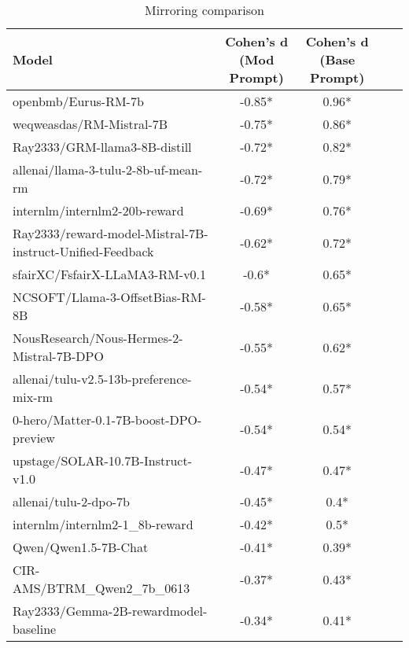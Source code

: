 \begin{table*}[htp]
\centering
\small
\begin{tabular}{lcc|cc}
\toprule
Model & Cohen's d (Mod Prompt) & Cohen's d (Base Prompt) \\
\midrule
openbmb/Eurus-RM-7b & -0.85* & 0.96* \\
weqweasdas/RM-Mistral-7B & -0.75* & 0.86* \\
Ray2333/GRM-llama3-8B-distill & -0.72* & 0.82* \\
allenai/llama-3-tulu-2-8b-uf-mean-rm & -0.72* & 0.79* \\
internlm/internlm2-20b-reward & -0.69* & 0.76* \\
Ray2333/reward-model-Mistral-7B-instruct-Unified-Feedback & -0.62* & 0.72* \\
sfairXC/FsfairX-LLaMA3-RM-v0.1 & -0.6* & 0.65* \\
NCSOFT/Llama-3-OffsetBias-RM-8B & -0.58* & 0.65* \\
NousResearch/Nous-Hermes-2-Mistral-7B-DPO & -0.55* & 0.62* \\
allenai/tulu-v2.5-13b-preference-mix-rm & -0.54* & 0.57* \\
0-hero/Matter-0.1-7B-boost-DPO-preview & -0.54* & 0.54* \\
upstage/SOLAR-10.7B-Instruct-v1.0 & -0.47* & 0.47* \\
allenai/tulu-2-dpo-7b & -0.45* & 0.4* \\
internlm/internlm2-1\_8b-reward & -0.42* & 0.5* \\
Qwen/Qwen1.5-7B-Chat & -0.41* & 0.39* \\
CIR-AMS/BTRM\_Qwen2\_7b\_0613 & -0.37* & 0.43* \\
Ray2333/Gemma-2B-rewardmodel-baseline & -0.34* & 0.41* \\
\bottomrule
\end{tabular}
\normalsize
\caption{Mirroring comparison}
\label{tab:combined_results}
\end{table*}
